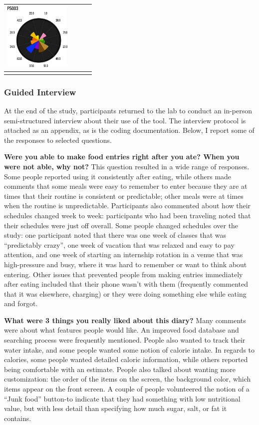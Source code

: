 \begin{table}[htbp]
\begin{tabular}{p{1.25in}p{1.25in}p{1.25in}p{1.25in}}
\includegraphics[width=1.25in]{./images/cont4/polar_charts/p5003}\\
\bottomrule
\label{tab:insitu_component_counts}
\end{tabular}
\end{table}

\subsubsection{Guided Interview}
At the end of the study, participants returned to the lab to conduct an in-person semi-structured interview about their use of the tool. The interview protocol is attached as an appendix, as is the coding documentation. Below, I report some of the responses to selected questions. 

\textbf{Were you able to make food entries right after you ate? When you were not able, why not?}
This question resulted in a wide range of responses. Some people reported using it consistently after eating, while others made comments that some meals were easy to remember to enter because they are at times that their routine is consistent or predictable; other meals were at times when the routine is unpredictable. Participants also commented about how their schedules changed week to week: participants who had been traveling noted that their schedules were just off overall. Some people changed schedules over the study: one participant noted that there was one week of classes that was ``predictably crazy'', one week of vacation that was relaxed and easy to pay attention, and one week of starting an internship rotation in a venue that was high-pressure and busy, where it was hard to remember or want to think about entering. Other issues that prevented people from making entries immediately after eating included that their phone wasn't with them (frequently commented that it was elsewhere, charging) or they were doing something else while eating and forgot. 

\textbf{What were 3 things you really liked about this diary?}
Many comments were about what features people would like. An improved food database and searching process were frequently mentioned. People also wanted to track their water intake, and some people wanted some notion of calorie intake. In regards to calories, some people wanted detailed caloric information, while others reported being comfortable with an estimate. People also talked about wanting more customization: the order of the items on the screen, the background color, which items appear on the front screen. A couple of people volunteered the notion of a ``Junk food'' button-to indicate that they had something with low nutritional value, but with less detail than specifying how much sugar, salt, or fat it contains. 

